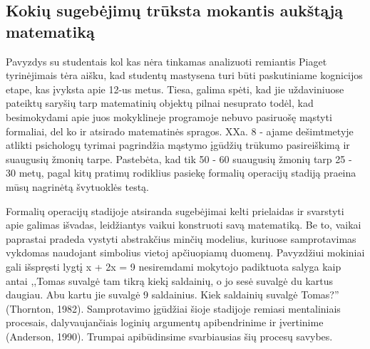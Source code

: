 \documentclass{article}
\begin{document}
\subsection{Kokių sugebėjimų trūksta mokantis aukštąją matematiką}

Pavyzdys su studentais kol kas nėra tinkamas analizuoti remiantis Piaget tyrinėjimais tėra aišku, kad studentų
mastysena turi būti paskutiniame kognicijos etape, kas įvyksta apie 12-us metus. Tiesa, galima spėti, kad jie uždaviniuose pateiktų saryšių tarp matematinių objektų pilnai nesuprato todėl, kad besimokydami apie juos mokyklineje programoje
nebuvo pasiruošę mąstyti formaliai, del ko ir atsirado matematinės spragos. XXa. 8 - ajame dešimtmetyje atlikti psichologų tyrimai pagrindžia mąstymo įgūdžių trūkumo pasireiškimą ir suaugusių žmonių tarpe. Pastebėta, kad tik 50 - 60%
suaugusių žmonių tarp 25 - 30 metų, pagal kitų pratimų rodiklius pasiekę formalių operacijų stadiją praeina mūsų
nagrinėtą švytuoklės testą. 

Formalių operacijų stadijoje atsiranda sugebėjimai kelti prielaidas ir svarstyti apie galimas išvadas, leidžiantys
vaikui konstruoti savą matematiką. Be to, vaikai paprastai pradeda vystyti abstrakčius minčių modelius,
kuriuose samprotavimas vykdomas naudojant simbolius vietoj apčiuopiamų duomenų. Pavyzdžiui mokiniai gali
išspręsti lygtį x + 2x = 9 nesiremdami mokytojo padiktuota salyga kaip antai ,,Tomas suvalgė tam tikrą kiekį
saldainių, o jo sesė suvalgė du kartus daugiau. Abu kartu jie suvalgė 9 saldainius. Kiek saldainių suvalgė
Tomas?'' (Thornton, 1982). Samprotavimo įgūdžiai šioje stadijoje remiasi mentaliniais procesais, dalyvaujančiais
loginių argumentų apibendrinime ir įvertinime (Anderson, 1990). Trumpai apibūdinsime svarbiausias šių
procesų savybes.
\end{document}
